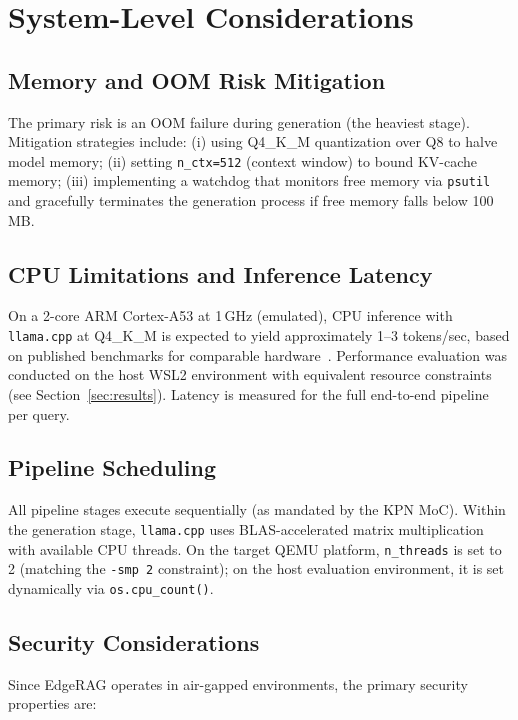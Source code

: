 \documentclass[10pt,twocolumn]{article}
\begin{document}
\section{System-Level Considerations}
\label{sec:considerations}

\subsection{Memory and OOM Risk Mitigation}

The primary risk is an OOM failure during generation (the heaviest stage). Mitigation strategies include: (i) using Q4\_K\_M quantization over Q8 to halve model memory; (ii) setting \texttt{n\_ctx=512} (context window) to bound KV-cache memory; (iii) implementing a watchdog that monitors free memory via \texttt{psutil} and gracefully terminates the generation process if free memory falls below 100\,MB.

\subsection{CPU Limitations and Inference Latency}

On a 2-core ARM Cortex-A53 at 1\,GHz (emulated), CPU inference with \texttt{llama.cpp} at Q4\_K\_M is expected to yield approximately 1–3 tokens/sec, based on published benchmarks for comparable hardware~\cite{edgeai2023rag}. Performance evaluation was conducted on the host WSL2 environment with equivalent resource constraints (see Section~\ref{sec:results}). Latency is measured for the full end-to-end pipeline per query.

\subsection{Pipeline Scheduling}

All pipeline stages execute sequentially (as mandated by the KPN MoC). Within the generation stage, \texttt{llama.cpp} uses BLAS-accelerated matrix multiplication with available CPU threads. On the target QEMU platform, \texttt{n\_threads} is set to 2 (matching the \texttt{-smp 2} constraint); on the host evaluation environment, it is set dynamically via \texttt{os.cpu\_count()}.

\subsection{Security Considerations}

Since EdgeRAG operates in air-gapped environments, the primary security properties are:
\end{document}

